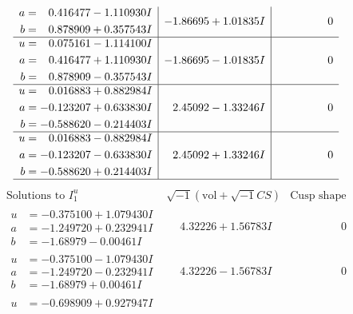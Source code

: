 \documentclass[1p]{elsarticle_modified}
\theoremstyle{definition}
\newcommand{\I}{\sqrt{-1}}
\begin{document}
$$\begin{array}{c|c|c}
\begin{aligned}
a &= \phantom{-}0.416477 - 1.110930 I \\
b &= \phantom{-}0.878909 + 0.357543 I\end{aligned}
 & -1.86695 + 1.01835 I & \phantom{-0.000000 } 0 \\ \hline\begin{aligned}
u &= \phantom{-}0.075161 - 1.114100 I \\
a &= \phantom{-}0.416477 + 1.110930 I \\
b &= \phantom{-}0.878909 - 0.357543 I\end{aligned}
 & -1.86695 - 1.01835 I & \phantom{-0.000000 } 0 \\ \hline\begin{aligned}
u &= \phantom{-}0.016883 + 0.882984 I \\
a &= -0.123207 + 0.633830 I \\
b &= -0.588620 - 0.214403 I\end{aligned}
 & \phantom{-}2.45092 - 1.33246 I & \phantom{-0.000000 } 0 \\ \hline\begin{aligned}
u &= \phantom{-}0.016883 - 0.882984 I \\
a &= -0.123207 - 0.633830 I \\
b &= -0.588620 + 0.214403 I\end{aligned}
 & \phantom{-}2.45092 + 1.33246 I & \phantom{-0.000000 } 0\\
 \hline 
 \end{array}$$\newpage$$\begin{array}{c|c|c}  
\text{Solutions to }I^u_{1}& \I (\text{vol} + \sqrt{-1}CS) & \text{Cusp shape}\\
 \hline 
\begin{aligned}
u &= -0.375100 + 1.079430 I \\
a &= -1.249720 + 0.232941 I \\
b &= -1.68979 - 0.00461 I\end{aligned}
 & \phantom{-}4.32226 + 1.56783 I & \phantom{-0.000000 } 0 \\ \hline\begin{aligned}
u &= -0.375100 - 1.079430 I \\
a &= -1.249720 - 0.232941 I \\
b &= -1.68979 + 0.00461 I\end{aligned}
 & \phantom{-}4.32226 - 1.56783 I & \phantom{-0.000000 } 0 \\ \hline\begin{aligned}
u &= -0.698909 + 0.927947 I \\

\end{aligned}
\end{array}$$
\end{document}

